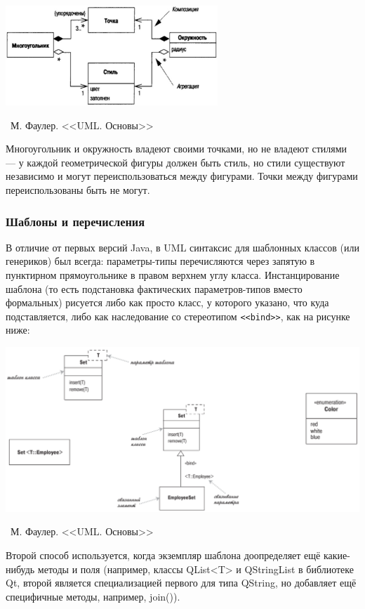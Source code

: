 \documentclass[a5paper]{article}
\newcommand{\attribution}[1] {
    \vspace{-5mm}\begin{flushright}\begin{scriptsize}%
    {\textcopyright\, #1}\end{scriptsize}\end{flushright}
}
\begin{document}
\begin{center}
    \includegraphics[width=0.6\textwidth]{aggregationAndCompositionExample.png}
    \attribution{М. Фаулер. <<UML. Основы>>}
\end{center}

Многоугольник и окружность владеют своими точками, но не владеют стилями --- у каждой геометрической фигуры должен быть стиль, но стили существуют независимо и могут переиспользоваться между фигурами. Точки между фигурами переиспользованы быть не могут.

\subsubsection{Шаблоны и перечисления}

В отличие от первых версий Java, в UML синтаксис для шаблонных классов (или генериков) был всегда: параметры-типы перечисляются через запятую в пунктирном прямоугольнике в правом верхнем углу класса. Инстанцирование шаблона (то есть подстановка фактических параметров-типов вместо формальных) рисуется либо как просто класс, у которого указано, что куда подставляется, либо как наследование со стереотипом \verb|<<bind>>|, как на рисунке ниже:

\begin{center}
    \includegraphics[width=\textwidth]{genericsAndEnums.png}
    \attribution{М. Фаулер. <<UML. Основы>>}
\end{center}

Второй способ используется, когда экземпляр шаблона доопределяет ещё какие-нибудь методы и поля (например, классы QList<T> и QStringList в библиотеке Qt, второй является специализацией первого для типа QString, но добавляет ещё специфичные методы, например, join()).
\end{document}
